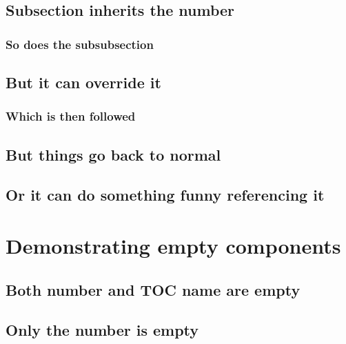 \documentclass{homework}
\begin{document}
\lipsum[9]

\subsection{Subsection inherits the number}

\subsubsection{So does the subsubsection}

\lipsum[10]

\subsection[C$\xi$.b|]{But it can override it}

\subsubsection{Which is then followed}

\lipsum[11]

\subsection{But things go back to normal}

\lipsum[12]

\subsection[\thesection.$\delta$|]{Or it can do something funny referencing it}

\lipsum[13]

\section{Demonstrating empty components}

\lipsum[14]

\subsection[|]{Both number and TOC name are empty}

\lipsum[15]

\subsection[|Empty number]{Only the number is empty}
\end{document}
